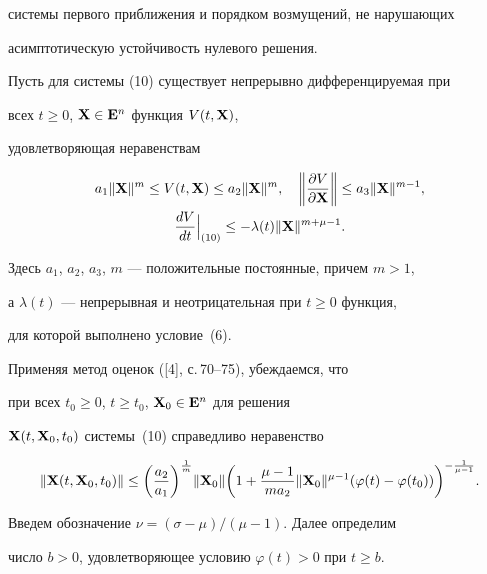 системы первого приближения и порядком возмущений, не нарушающих


асимптотическую устойчивость нулевого решения.





Пусть для системы (10) существует непрерывно дифференцируемая при


всех $t\geq 0$, $\bold X\in \bold E^n$ функция $V(t,\bold X)$,


удовлетворяющая неравенствам


\begin{gather}


a_1 \|\bold X\|^m \leq V(t,\bold X) \leq a_2  \|\bold X\|^m,


\quad \bigg\|\frac{\partial V}{\partial \bold X}\bigg\| \leq a_3


\|\bold X\|^{m-1}, \\


%


\frac{dV}{dt} \Big|_{(10)} \leq -\lambda(t) \|\bold X\|^{m+\mu-1}.


\end{gather}


Здесь $a_1$, $a_2$, $a_3$, $m$ --- положительные постоянные, причем $m>1$,


а $\lambda(t)$ --- непрерывная и неотрицательная при $t\geq 0$ функция,


для которой выполнено условие~(6).


Применяя метод оценок ([4], с.\,70--75), убеждаемся, что


при всех $t_0\geq 0$, $t\geq t_0$, $\bold X_0 \in \bold E^n$ для решения


$\bold X(t,\bold X_0,t_0)$ системы~(10) справедливо неравенство


$$


\|\bold X(t,\bold X_0,t_0)\|\leq \bigg(\frac{a_2}{a_1}\bigg)


^{\frac{1}{m}} \|\bold X_0\|


\bigg(1+\frac{\mu-1}{m a_2} \|\bold X_0\|^{\mu-1}


(\varphi(t)-\varphi(t_0)) \bigg)^{-\frac{1}{\mu-1}}.


$$





Введем обозначение $\nu=(\sigma-\mu)/(\mu-1)$. Далее определим


число $b>0$, удовлетворяющее условию $\varphi(t)>0$ при $t\geq b$.





